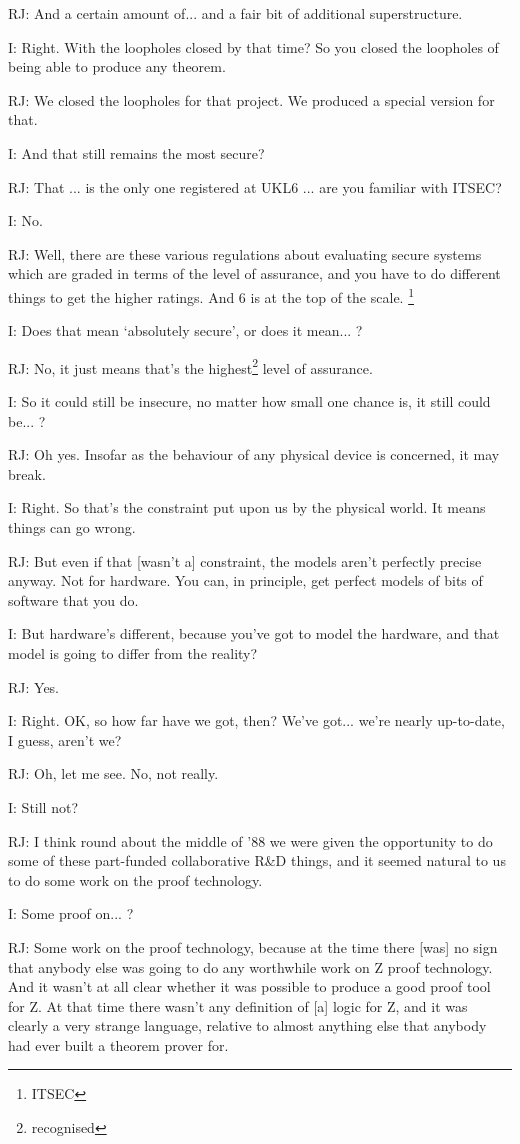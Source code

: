 \documentclass[10pt,titlepage]{book}
\begin{document}
RJ: And a certain amount of... and a fair bit of additional superstructure.

I: Right.
With the loopholes closed by that time?
So you closed the loopholes of being able to produce any theorem.

RJ: We closed the loopholes for that project.
We produced a special version for that.

I: And that still remains the most secure?

RJ: That ... is the only one registered at UKL6 ...
 are you familiar with ITSEC?

I: No.

RJ: Well, there are these various regulations about evaluating secure systems which are graded in terms of the level of assurance, and you have to do different things to get the higher ratings.
And 6 is at the top of the scale.
\footnote{ITSEC}

I: Does that mean `absolutely secure', or does it mean... ?

RJ: No, it just means that's the highest\footnote{recognised} level of assurance.

I: So it could still be insecure, no matter how small one chance is, it still could be... ?

RJ: Oh yes.
Insofar as the behaviour of any physical device is concerned, it may break.

I: Right.
So that's the constraint put upon us by the physical world.
It means things can go wrong.

RJ: But even if that [wasn't a] constraint, the models aren't perfectly precise anyway.
Not for hardware.
You can, in principle, get perfect models of bits of software that you do.

I: But hardware's different, because you've got to model the hardware, and that model is going to differ from the reality?

RJ: Yes.

I: Right.
OK, so how far have we got, then?
We've got... we're nearly up-to-date, I guess, aren't we?

RJ: Oh, let me see.
No, not really.

I: Still not?

RJ: I think round about the middle of '88 we were given the opportunity to do some of these part-funded collaborative R\&D things, and it seemed natural to us to do some work on the proof technology.

I: Some proof on... ?

RJ: Some work on the proof technology, because at the time there [was] no sign that anybody else was going to do any worthwhile work on Z proof technology.
And it wasn't at all clear whether it was possible to produce a good proof tool for Z.
At that time there wasn't any definition of [a] logic for Z, and it was clearly a very strange language, relative to almost anything else that anybody had ever built a theorem prover for.
\end{document}
